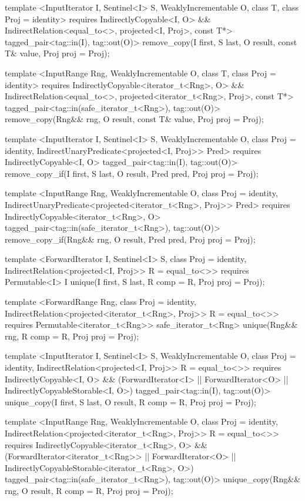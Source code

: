 \begin{codeblock}
{{{{  template <InputIterator I, Sentinel<I> S, WeaklyIncrementable O, class T,
      class Proj = identity>
    requires IndirectlyCopyable<I, O> &&
      IndirectRelation<equal_to<>, projected<I, Proj>, const T*>
    tagged_pair<tag::in(I), tag::out(O)>
      remove_copy(I first, S last, O result, const T& value, Proj proj = Proj{});

  template <InputRange Rng, WeaklyIncrementable O, class T, class Proj = identity>
    requires IndirectlyCopyable<iterator_t<Rng>, O> &&
      IndirectRelation<equal_to<>, projected<iterator_t<Rng>, Proj>, const T*>
    tagged_pair<tag::in(safe_iterator_t<Rng>), tag::out(O)>
      remove_copy(Rng&& rng, O result, const T& value, Proj proj = Proj{});

  template <InputIterator I, Sentinel<I> S, WeaklyIncrementable O,
      class Proj = identity, IndirectUnaryPredicate<projected<I, Proj>> Pred>
    requires IndirectlyCopyable<I, O>
    tagged_pair<tag::in(I), tag::out(O)>
      remove_copy_if(I first, S last, O result, Pred pred, Proj proj = Proj{});

  template <InputRange Rng, WeaklyIncrementable O, class Proj = identity,
      IndirectUnaryPredicate<projected<iterator_t<Rng>, Proj>> Pred>
    requires IndirectlyCopyable<iterator_t<Rng>, O>
    tagged_pair<tag::in(safe_iterator_t<Rng>), tag::out(O)>
      remove_copy_if(Rng&& rng, O result, Pred pred, Proj proj = Proj{});

  template <ForwardIterator I, Sentinel<I> S, class Proj = identity,
      IndirectRelation<projected<I, Proj>> R = equal_to<>>
    requires Permutable<I>
    I unique(I first, S last, R comp = R{}, Proj proj = Proj{});

  template <ForwardRange Rng, class Proj = identity,
      IndirectRelation<projected<iterator_t<Rng>, Proj>> R = equal_to<>>
    requires Permutable<iterator_t<Rng>>
    safe_iterator_t<Rng>
      unique(Rng&& rng, R comp = R{}, Proj proj = Proj{});

  template <InputIterator I, Sentinel<I> S, WeaklyIncrementable O,
      class Proj = identity, IndirectRelation<projected<I, Proj>> R = equal_to<>>
    requires IndirectlyCopyable<I, O> && (ForwardIterator<I> ||
      ForwardIterator<O> || IndirectlyCopyableStorable<I, O>)
    tagged_pair<tag::in(I), tag::out(O)>
      unique_copy(I first, S last, O result, R comp = R{}, Proj proj = Proj{});

  template <InputRange Rng, WeaklyIncrementable O, class Proj = identity,
      IndirectRelation<projected<iterator_t<Rng>, Proj>> R = equal_to<>>
    requires IndirectlyCopyable<iterator_t<Rng>, O> &&
      (ForwardIterator<iterator_t<Rng>> || ForwardIterator<O> ||
       IndirectlyCopyableStorable<iterator_t<Rng>, O>)
    tagged_pair<tag::in(safe_iterator_t<Rng>), tag::out(O)>
      unique_copy(Rng&& rng, O result, R comp = R{}, Proj proj = Proj{});

}}}}
\end{codeblock}
